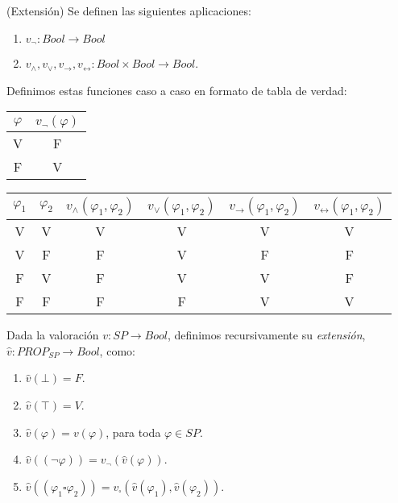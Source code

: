 \begin{definition}\label{def : ext}(Extensión) Se definen las siguientes aplicaciones:
\begin{enumerate}
    \item $v_{\neg}: Bool \rightarrow Bool$
    \item $v_\land, v_\lor, v_\rightarrow, v_\leftrightarrow: Bool \times Bool \rightarrow Bool$.
\end{enumerate}
Definimos estas funciones caso a caso en formato de tabla de verdad:
\begin{table}[htbp]
\begin{center}
\begin{tabular}{|c|c|}
\hline
$\varphi$ & $v_{\neg}(\varphi)$ \\
\hline \hline
V & F \\ \hline
F & V \\ \hline
\end{tabular}
\end{center}
\end{table}


\begin{table}[htbp]
\begin{center}
\begin{tabular}{|c|c|c|c|c|c|}
\hline
$\varphi_1$ & $\varphi_2$ & $v_{\land}(\varphi_1, \varphi_2)$ & $v_{\lor}(\varphi_1, \varphi_2)$ & $v_{\rightarrow}(\varphi_1, \varphi_2)$ & $v_{\leftrightarrow}(\varphi_1, \varphi_2)$ \\
\hline \hline
V & V & V & V & V & V\\ \hline
V & F & F & V & F & F\\ \hline
F & V & F & V & V & F\\ \hline
F & F & F & F & V & V\\ \hline
\end{tabular}
\end{center}
\end{table}

Dada la valoración $v: SP \rightarrow Bool$, definimos recursivamente su \textit{extensión}, $\hat{v}: PROP_{SP} \rightarrow Bool$, como:
\begin{enumerate}
    \item $\hat{v}(\bot) = F$.
    \item $\hat{v}(\top) = V$.
    \item $\hat{v}(\varphi) = v(\varphi)$, para toda $\varphi \in SP$.
    \item $\hat{v}((\neg \varphi)) = v_{\neg}(\hat{v}(\varphi))$.
    \item $\hat{v}((\varphi_1 \square \varphi_2)) = v_{\square}(\hat{v}(\varphi_1), \hat{v}(\varphi_2))$.
\end{enumerate}
\end{definition}

